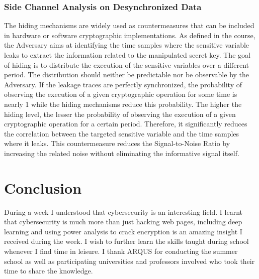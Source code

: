 \documentclass[runningheads]{llncs}
\begin{document}
\subsubsection{Side Channel Analysis on Desynchronized Data}
The hiding mechanisms are widely used as countermeasures that can be included in hardware or software cryptographic implementations. As defined in the course, the Adversary aims at identifying the time samples where the sensitive variable leaks to extract the information related to the manipulated secret key. The goal of hiding is to distribute the execution of the sensitive variables over a different period. The distribution should neither be predictable nor be observable by the Adversary. If the leakage traces are perfectly synchronized, the probability of observing the execution of a given cryptographic operation for some time is nearly  1  while the hiding mechanisms reduce this probability. The higher the hiding level, the lesser the probability of observing the execution of a given cryptographic operation for a certain period. Therefore, it significantly reduces the correlation between the targeted sensitive variable and the time samples where it leaks. This countermeasure reduces the Signal-to-Noise Ratio by increasing the related noise without eliminating the informative signal itself.

\section{Conclusion}
During a week I understood that cybersecurity is an interesting field. I learnt that cybersecurity is much more than just hacking web pages, including deep learning and using power analysis to crack encryption is an amazing insight I received during the week. 
I wish to further learn the skills taught during school whenever I find time in leisure. I thank ARQUS for conducting the summer school as well as participating universities and professors involved who took their time to share the knowledge.
\end{document}
